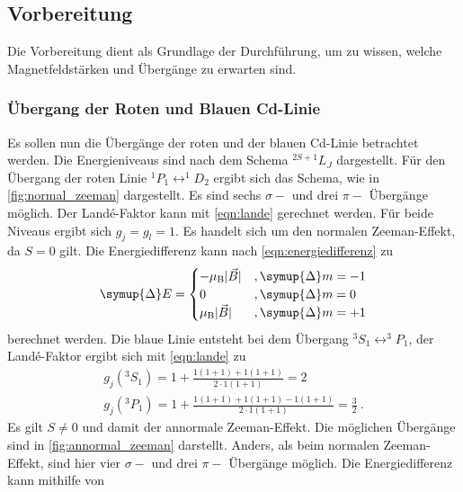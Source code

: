\subsection{Vorbereitung}

    Die Vorbereitung dient als Grundlage der Durchführung,
    um zu wissen, 
    welche Magnetfeldstärken und Übergänge zu erwarten sind.

\subsubsection{Übergang der Roten und Blauen Cd-Linie}
\label{sec:vorb_uebergaenge}

    Es sollen nun die Übergänge der roten und der blauen Cd-Linie betrachtet werden.
    Die Energieniveaus sind nach dem Schema $^{2S+1}L_J$ dargestellt.
    Für den Übergang der roten Linie $^1P_1 \leftrightarrow ^1D_2$ ergibt sich das Schema,
    wie in \autoref{fig:normal_zeeman} dargestellt.
    Es sind sechs $\sigma-$ und drei $\pi-$ Übergänge möglich.
    Der Landé-Faktor kann mit \autoref{eqn:lande} gerechnet werden. 
    Für beide Niveaus ergibt sich $g_j = g_l = 1$.
    Es handelt sich um den normalen Zeeman-Effekt,
    da $S = 0$ gilt.
    Die Energiedifferenz kann nach \autoref{eqn:energiedifferenz} zu
    \begin{equation*}
        \symup{\Delta} E = 
        \begin{cases}
            - \mu_\text{B} \lvert \vec{B} \rvert & , \symup{\Delta} m = -1 \\
            0 & , \symup{\Delta} m = 0 \\
            \mu_\text{B} \lvert \vec{B} \rvert & , \symup{\Delta} m = +1
        \end{cases}
    \end{equation*} 
    berechnet werden.
    Die blaue Linie entsteht bei dem Übergang $^3S_1 \leftrightarrow ^3P_1$,
    der Landé-Faktor ergibt sich mit \autoref{eqn:lande} zu
    \begin{gather*}
        g_j(^3S_1) = 1 + \frac{1(1+1)+1(1+1)}{2 \cdot 1(1+1)} = 2 \\
        g_j(^3P_1) = 1 + \frac{1(1+1)+1(1+1)-1(1+1)}{2 \cdot 1(1+1)} = \frac{3}{2} \ . 
    \end{gather*}
    Es gilt $S \neq 0$ und damit der annormale Zeeman-Effekt.
    Die möglichen Übergänge sind in \autoref{fig:annormal_zeeman} darstellt.
    Anders, 
    als beim normalen Zeeman-Effekt,
    sind hier vier $\sigma-$ und drei $\pi-$ Übergänge möglich.
    Die Energiedifferenz kann mithilfe von

